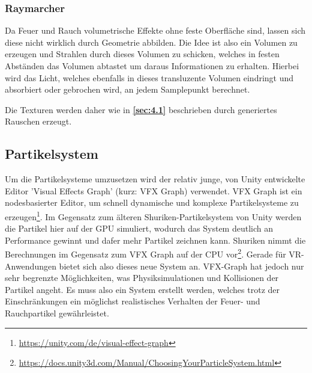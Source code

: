 \subsubsection{Raymarcher}

Da Feuer und Rauch volumetrische Effekte ohne feste Oberfläche sind, lassen sich diese nicht wirklich durch Geometrie abbilden. Die Idee ist also ein
Volumen zu erzeugen und Strahlen durch dieses Volumen zu schicken, welches in festen Abständen das Volumen abtastet um daraus Informationen zu erhalten.
Hierbei wird das Licht, welches ebenfalls in dieses transluzente Volumen eindringt und absorbiert oder gebrochen wird, an jedem Samplepunkt berechnet.

Die Texturen werden daher wie in \textbf{\autoref{sec:4.1}} beschrieben durch generiertes Rauschen erzeugt.



\subsection{Partikelsystem}
Um die Partikelsysteme umzusetzen wird der relativ junge, von Unity entwickelte Editor 'Visual Effects Graph'
(kurz: VFX Graph) verwendet. VFX Graph ist ein nodesbasierter Editor, um schnell
dynamische und komplexe Partikelsysteme zu erzeugen\footnote{\url{https://unity.com/de/visual-effect-graph}}.
Im Gegensatz zum älteren Shuriken-Partikelsystem von Unity werden die Partikel hier auf der GPU
simuliert, wodurch das System deutlich an Performance gewinnt und dafer mehr Partikel zeichnen kann.
Shuriken nimmt die Berechnungen im Gegensatz zum VFX Graph auf der CPU vor\footnote{\url{https://docs.unity3d.com/Manual/ChoosingYourParticleSystem.html}}.
Gerade für VR-Anwendungen bietet sich also dieses neue System an.
VFX-Graph hat jedoch nur sehr begrenzte Möglichkeiten, was Physiksimulationen und Kollisionen der Partikel angeht.
Es muss also ein System erstellt werden, welches trotz der Einschränkungen ein möglichst realistisches
Verhalten der Feuer- und Rauchpartikel gewährleistet.




\newpage
